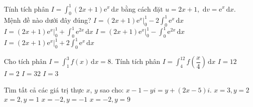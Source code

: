\begin{ex}%
Tính tích phân $I=\displaystyle \int_{0}^{1} (2x+1)\mathrm{e}^x \mathrm{\, d}x$ bằng cách đặt $u=2x+1$, $\mathrm{\, d}v=\mathrm{e}^x\mathrm{\, d}x$. Mệnh đề nào dưới đây đúng?
\choice
{\True $I={(2x+1)\mathrm{e}^x }\big|_0^1 -2{\displaystyle \int_{0}^{1} \mathrm{e}^x \mathrm{\, d}x}$}
{$I={(2x+1)\mathrm{e}^x }\big|_0^1 +{\displaystyle \int_{0}^{1} \mathrm{e}^{2x} \mathrm{\, d}x}$}
{$I={(2x+1)\mathrm{e}^x }\big|_0^1 - {\displaystyle \int_{0}^{1} \mathrm{e}^{2x} \mathrm{\, d}x}$}
{$I={(2x+1)\mathrm{e}^x }\big|_0^1  + 2{\displaystyle \int_{0}^{1} \mathrm{e}^x \mathrm{\, d}x}$}
\end{ex}
\begin{ex}%
Cho tích phân $I=\displaystyle \int_{1}^{3} f(x) \mathrm{\, d}x = 8$. Tính tích phân $I=\displaystyle \int_{4}^{12} f\left(\dfrac{x}{4}\right) \mathrm{\, d}x$
\choice
{$I=12$}
{$I=2$}
{\True $I=32$}
{$I=3$}
\end{ex}
\begin{ex}%
Tìm tất cả các giá trị thực $x$, $y$ sao cho: $x-1-yi=y+(2x-5)i$.
\choice
{$x=3,y=2$}
{\True $x=2,y=1$}
{$x=-2,y=-1$}
{$x=-2,y=9$}
\end{ex}
